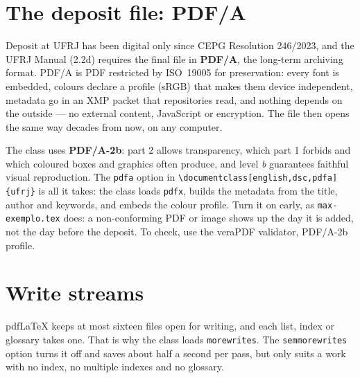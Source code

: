 \documentclass[english,dsc]{ufrj}
\begin{document}
  \section{The deposit file: PDF/A}
  Deposit at UFRJ has been digital only since CEPG Resolution 246/2023, and the
  UFRJ Manual (2.2d) requires the final file in \textbf{PDF/A}, the long-term
  archiving format. PDF/A is PDF restricted by ISO~19005 for preservation: every
  font is embedded, colours declare a profile (sRGB) that makes them device
  independent, metadata go in an XMP packet that repositories read, and nothing
  depends on the outside --- no external content, JavaScript or encryption. The
  file then opens the same way decades from now, on any computer.

  The class uses \textbf{PDF/A-2b}: part 2 allows transparency, which part 1
  forbids and which coloured boxes and graphics often produce, and level
  \emph{b} guarantees faithful visual reproduction. The \texttt{pdfa} option in
  \verb|\documentclass[english,dsc,pdfa]{ufrj}| is all it takes: the class
  loads \texttt{pdfx}, builds the metadata from the title, author and keywords,
  and embeds the colour profile. Turn it on early, as \texttt{max-exemplo.tex}
  does: a non-conforming PDF or image shows up the day it is added, not the day
  before the deposit. To check, use the veraPDF validator, PDF/A-2b profile.

  \section{Write streams}
  pdf\LaTeX{} keeps at most sixteen files open for writing, and each list,
  index or glossary takes one. That is why the class loads
  \texttt{morewrites}. The \texttt{semmorewrites} option turns it off and saves
  about half a second per pass, but only suits a work with no index, no
  multiple indexes and no glossary.
\end{document}

